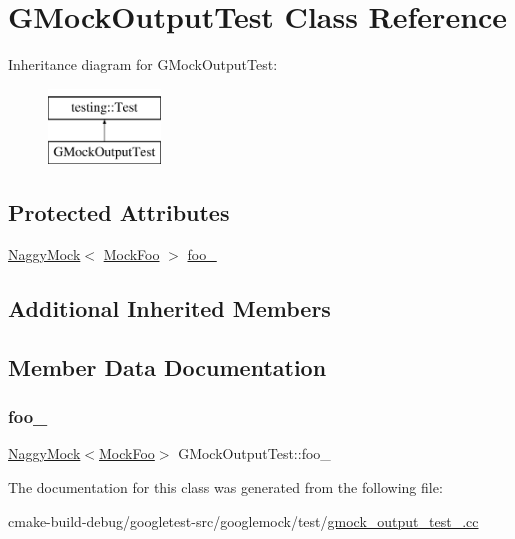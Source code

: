 \hypertarget{classGMockOutputTest}{}\section{G\+Mock\+Output\+Test Class Reference}
\label{classGMockOutputTest}
Inheritance diagram for G\+Mock\+Output\+Test\+:\begin{figure}[H]
\begin{center}
\leavevmode
\includegraphics[height=2.000000cm]{classGMockOutputTest}
\end{center}
\end{figure}
\subsection*{Protected Attributes}
\begin{DoxyCompactItemize}
\item 
\mbox{\hyperlink{classtesting_1_1NaggyMock}{Naggy\+Mock}}$<$ \mbox{\hyperlink{classMockFoo}{Mock\+Foo}} $>$ \mbox{\hyperlink{classGMockOutputTest_aed97d2ca515d69466968c60575cc18a2}{foo\+\_\+}}
\end{DoxyCompactItemize}
\subsection*{Additional Inherited Members}


\subsection{Member Data Documentation}
\mbox{\label{classGMockOutputTest_aed97d2ca515d69466968c60575cc18a2}} 
\subsubsection{\texorpdfstring{foo\_}{foo\_}}
{\footnotesize\ttfamily \mbox{\hyperlink{classtesting_1_1NaggyMock}{Naggy\+Mock}}$<$\mbox{\hyperlink{classMockFoo}{Mock\+Foo}}$>$ G\+Mock\+Output\+Test\+::foo\+\_\+\hspace{0.3cm}{\ttfamily [protected]}}



The documentation for this class was generated from the following file\+:\begin{DoxyCompactItemize}
\item 
cmake-\/build-\/debug/googletest-\/src/googlemock/test/\mbox{\hyperlink{gmock__output__test___8cc}{gmock\+\_\+output\+\_\+test\+\_\+.\+cc}}\end{DoxyCompactItemize}
